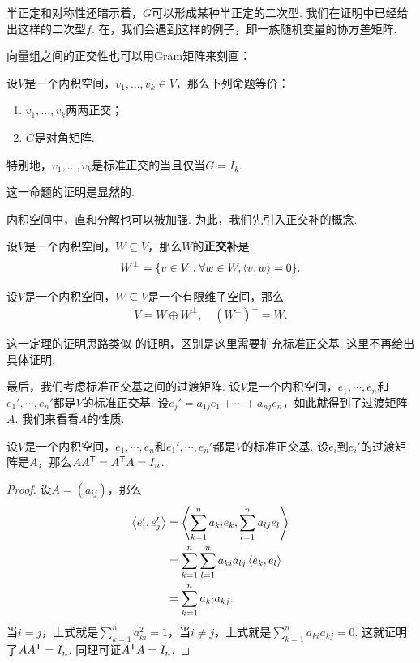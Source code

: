 半正定和对称性还暗示着，$G$可以形成某种半正定的二次型. 我们在证明中已经给出这样的二次型$f$. 在，我们会遇到这样的例子，即一族随机变量的协方差矩阵. 

向量组之间的正交性也可以用Gram矩阵来刻画：

\begin{proposition}\label{prop:orthogonal-gram}
设$V$是一个内积空间，$v_1,\dots,v_k\in V$，那么下列命题等价：
\begin{enumerate}
    \item $v_1,\dots,v_k$两两正交；
    \item $G$是对角矩阵. 
\end{enumerate}
特别地，$v_1,\dots,v_k$是标准正交的当且仅当$G=I_k$.
\end{proposition}

这一命题的证明是显然的.

内积空间中，直和分解也可以被加强. 为此，我们先引入正交补的概念. 

\begin{definition}[正交补]\label{def:orthogonal-complement}
设$V$是一个内积空间，$W\subseteq V$，那么$W$的\textbf{正交补}是
\[
    W^\bot=\{v\in V:\forall w\in W,\left\langle{v},{w}\right\rangle=0\}.
\]
\end{definition}

\begin{theorem}\label{prop:orthogonal-complement}
设$V$是一个内积空间，$W\subseteq V$是一个有限维子空间，那么
\[
    V=W\oplus W^\bot,\quad (W^\bot)^\bot=W.
\]
\end{theorem}

这一定理的证明思路类似 的证明，区别是这里需要扩充标准正交基. 这里不再给出具体证明. 

最后，我们考虑标准正交基之间的过渡矩阵. 设$V$是一个内积空间，$e_1,\cdots,e_n$和$e_1',\cdots,e_n'$都是$V$的标准正交基. 设$e_j'=a_{1j}e_1+\cdots+a_{nj}e_n$，如此就得到了过渡矩阵$A$. 我们来看看$A$的性质. 

\begin{proposition}
设$V$是一个内积空间，$e_1,\cdots,e_n$和$e_1',\cdots,e_n'$都是$V$的标准正交基. 设$e_i$到$e_i'$的过渡矩阵是$A$，那么$AA^{\mathsf{T}}=A^{\mathsf{T}} A=I_n$.
\end{proposition}
\begin{proof}
设$A=(a_{ij})$，那么
\begin{align*}
    \left\langle{e_i'},{e_j'}\right\rangle&=\left\langle{\sum_{k=1}^na_{ki}e_k},{\sum_{l=1}^na_{lj}e_l}\right\rangle \\
    &=\sum_{k=1}^n\sum_{l=1}^na_{ki}a_{lj}\left\langle{e_k},{e_l}\right\rangle \\
    &=\sum_{k=1}^na_{ki}a_{kj}.
\end{align*}
当$i=j$，上式就是$\sum_{k=1}^na_{ki}^2=1$，当$i\neq j$，上式就是$\sum_{k=1}^na_{ki}a_{kj}=0$. 这就证明了$AA^{\mathsf{T}}=I_n$. 同理可证$A^{\mathsf{T}} A=I_n$.
\end{proof}

